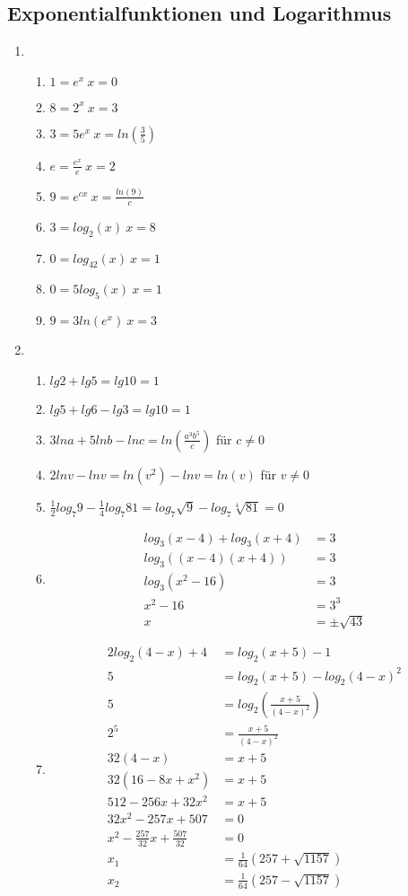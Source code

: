  \subsection{Exponentialfunktionen und Logarithmus}
  \begin{enumerate}
	\item %
	\begin{enumerate}
   \item $1=e^x \ x=0$
   \item $8=2^x \ x=3$
   \item $3=5e^x \ x=ln(\frac{3}{5})$
   \item $e=\frac{e^x}{e} \ x=2$   
   \item $9=e^{cx} \ x=\frac{ln(9)}{c}$ 
   \item $3=log_2(x)  \ x=8$
   \item $0=log_{42}(x) \ x=1$
   \item $0=5log_5(x) \ x=1$
   \item $9=3ln(e^x) \ x=3$
   
 
 \end{enumerate} 
  \item %
  \begin{enumerate}
  
  \item $lg2+lg5=lg10=1$
  \item $lg5+lg6-lg3=lg10=1$
  \item $3lna+5lnb-lnc=ln(\frac{a^3b^5}{c})$ f\"ur $c\neq0$
  \item $2lnv-lnv=ln(v^2)-lnv=ln(v)$  f\"ur $v\neq0$
  \item $\frac{1}{2}log_7 9 - \frac{1}{4} log_7 81=log_7 \sqrt9 - log_7\sqrt[4]{81}=0 $
  \item \begin{align*} 
  log_3(x-4)+log_3(x+4) &= 3\\
  log_3((x-4)(x+4)) &= 3\\
  log_3(x^2-16) &=3\\
  x^2-16 &=3^3\\
  x&= \pm\sqrt{43}
  \end{align*}
  \item \begin{align*} 
   2log_2(4-x)+4&=log_2(x+5)-1\\
   5&=log_2(x+5)-log_2(4-x)^2\\
   5&=log_2(\frac{x+5}{(4-x)^2})\\
   2^5&=\frac{x+5}{(4-x)^2}\\
   32(4-x) &= x+5\\
   32(16-8x+x^2)&=x+5\\
   512-256x+32x^2&=x+5\\
   32x^2-257x+507&=0\\
   x^2- \frac{257}{32}x + \frac{507}{32} &=0\\
   x_1&=\frac{1}{64}(257+\sqrt{1157}) \\
   x_2&=\frac{1}{64}(257-\sqrt{1157}) \\
   \end{align*} 
  

\end{enumerate}
\end{enumerate}
